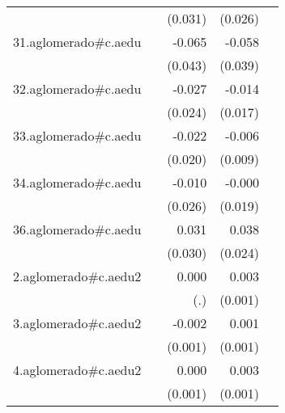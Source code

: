 {\begin{longtable}{l*{4}{D{.}{.}{-1}}}
            &                     &     (0.031)         &     (0.026)         &                     \\
\addlinespace
31.aglomerado#c.aedu&                     &      -0.065         &      -0.058         &                     \\
            &                     &     (0.043)         &     (0.039)         &                     \\
\addlinespace
32.aglomerado#c.aedu&                     &      -0.027         &      -0.014         &                     \\
            &                     &     (0.024)         &     (0.017)         &                     \\
\addlinespace
33.aglomerado#c.aedu&                     &      -0.022         &      -0.006         &                     \\
            &                     &     (0.020)         &     (0.009)         &                     \\
\addlinespace
34.aglomerado#c.aedu&                     &      -0.010         &      -0.000         &                     \\
            &                     &     (0.026)         &     (0.019)         &                     \\
\addlinespace
36.aglomerado#c.aedu&                     &       0.031         &       0.038         &                     \\
            &                     &     (0.030)         &     (0.024)         &                     \\
\addlinespace
2.aglomerado#c.aedu2&                     &       0.000         &       0.003\sym{***}&                     \\
            &                     &         (.)         &     (0.001)         &                     \\
\addlinespace
3.aglomerado#c.aedu2&                     &      -0.002         &       0.001         &                     \\
            &                     &     (0.001)         &     (0.001)         &                     \\
\addlinespace
4.aglomerado#c.aedu2&                     &       0.000         &       0.003\sym{***}&                     \\
            &                     &     (0.001)         &     (0.001)         &                     \\

\end{longtable}}
